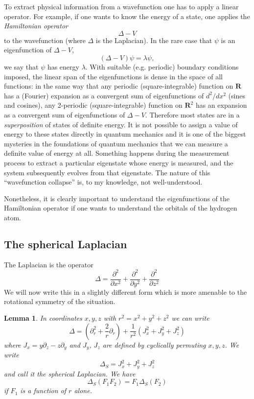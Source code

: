 \documentclass[12pt]{article}
\newcommand{\RR}{\mathbf{R}}
\newtheorem{lma}[thm]{Lemma}
\theoremstyle{definition}
\theoremstyle{check}
\theoremstyle{remark}
\theoremstyle{TheoremNum}
\begin{document}
To extract physical information from a wavefunction one has to apply a linear operator. For example, if one wants to know the energy of a state, one applies the {\em Hamiltonian operator}
\[\Delta-V\]
to the wavefunction (where $\Delta$ is the Laplacian). In the rare case that $\psi$ is an eigenfunction of $\Delta-V$,
\[(\Delta-V)\psi=\lambda\psi,\]
we say that $\psi$ has energy $\lambda$. With suitable (e.g. periodic) boundary conditions imposed, the linear span of the eigenfunctions is dense in the space of all functions: in the same way that any periodic (square-integrable) function on $\RR$ has a (Fourier) expansion as a convergent sum of eigenfunctions of $d^2/dx^2$ (sines and cosines), any 2-periodic (square-integrable) function on $\RR^2$ has an expansion as a convergent sum of eigenfunctions of $\Delta-V$. Therefore most states are in a {\em superposition} of states of definite energy. It is not possible to assign a value of energy to these states directly in quantum mechanics and it is one of the biggest mysteries in the foundations of quantum mechanics that we can measure a definite value of energy at all. Something happens during the measurement process to extract a particular eigenstate whose energy is measured, and the system subsequently evolves from that eigenstate. The nature of this ``wavefunction collapse'' is, to my knowledge, not well-understood.

Nonetheless, it is clearly important to understand the eigenfunctions of the Hamiltonian operator if one wants to understand the orbitals of the hydrogen atom.

\subsection{The spherical Laplacian}

The Laplacian is the operator
\[\Delta=\frac{\partial^2}{\partial x^2}+\frac{\partial^2}{\partial y^2}+\frac{\partial^2}{\partial z^2}\]
We will now write this in a slightly different form which is more amenable to the rotational symmetry of the situation.
\begin{lma}
In coordinates $x,y,z$ with $r^2=x^2+y^2+z^2$ we can write
\[\Delta=\left(\partial_r^2+\frac{2}{r}\partial_r\right)+\frac{1}{r^2}\left(J_x^2+J_y^2+J_z^2\right)\]
where $J_x=y\partial_z-z\partial_y$ and $J_y$, $J_z$ are defined by cyclically permuting $x,y,z$. We write
\[\Delta_S=J_x^2+J_y^2+J_z^2\]
and call it the {\em spherical Laplacian}. We have
\[\Delta_S(F_1F_2)=F_1\Delta_S(F_2)\]
if $F_1$ is a function of $r$ alone.
\end{lma}
\end{document}
